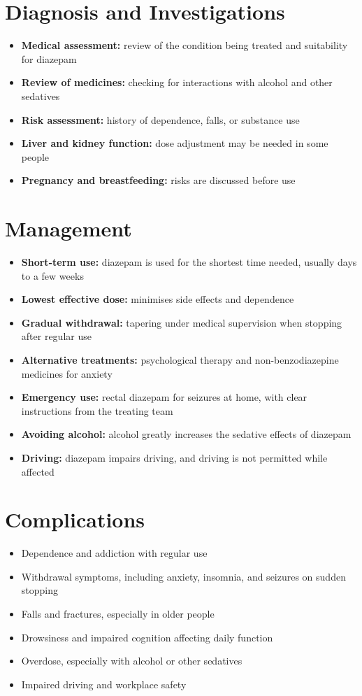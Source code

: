 \section*{Diagnosis and Investigations}
\begin{itemize}
    \item \textbf{Medical assessment:} review of the condition being treated and suitability for diazepam
    \item \textbf{Review of medicines:} checking for interactions with alcohol and other sedatives
    \item \textbf{Risk assessment:} history of dependence, falls, or substance use
    \item \textbf{Liver and kidney function:} dose adjustment may be needed in some people
    \item \textbf{Pregnancy and breastfeeding:} risks are discussed before use
\end{itemize}

\section*{Management}
\begin{itemize}
    \item \textbf{Short-term use:} diazepam is used for the shortest time needed, usually days to a few weeks
    \item \textbf{Lowest effective dose:} minimises side effects and dependence
    \item \textbf{Gradual withdrawal:} tapering under medical supervision when stopping after regular use
    \item \textbf{Alternative treatments:} psychological therapy and non-benzodiazepine medicines for anxiety
    \item \textbf{Emergency use:} rectal diazepam for seizures at home, with clear instructions from the treating team
    \item \textbf{Avoiding alcohol:} alcohol greatly increases the sedative effects of diazepam
    \item \textbf{Driving:} diazepam impairs driving, and driving is not permitted while affected
\end{itemize}

\section*{Complications}
\begin{itemize}
    \item Dependence and addiction with regular use
    \item Withdrawal symptoms, including anxiety, insomnia, and seizures on sudden stopping
    \item Falls and fractures, especially in older people
    \item Drowsiness and impaired cognition affecting daily function
    \item Overdose, especially with alcohol or other sedatives
    \item Impaired driving and workplace safety
\end{itemize}

